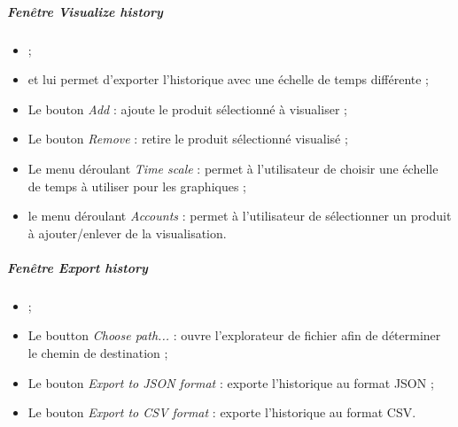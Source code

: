 \subparagraph{Fenêtre \emph{Visualize history}}
\begin{itemize}
\item {} ;
\item {} et lui permet d'exporter l'historique avec une échelle de temps différente ;
\item Le bouton \emph{Add} : ajoute le produit sélectionné à visualiser ;
\item Le bouton \emph{Remove} : retire le produit sélectionné visualisé ;
\item Le menu déroulant \emph{Time scale} : permet à l'utilisateur de choisir une échelle de temps à utiliser pour les graphiques ;
\item le menu déroulant \emph{Accounts} : permet à l'utilisateur de sélectionner un produit à ajouter/enlever de la visualisation.
\end{itemize}


\subparagraph{Fenêtre \emph{Export history}}
\begin{itemize}
\item {} ;
\item Le boutton \emph{Choose path...} : ouvre l'explorateur de fichier afin de déterminer le chemin de destination ;
\item Le bouton \emph{Export to JSON format} : exporte l'historique au format JSON ;
\item Le bouton \emph{Export to CSV format} : exporte l'historique au format CSV.
\end{itemize}


